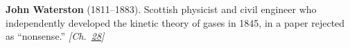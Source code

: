 \textbf{John Waterston} (1811–1883). Scottish physicist and civil engineer who independently developed the kinetic theory of gases in 1845, in a paper rejected as ``nonsense.'' \emph{[Ch.~\hyperref[ch:negativetemperature]{28}]}

